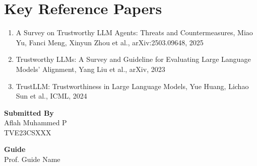 \documentclass[12pt]{article}
\newcommand{\studentname}{Aflah Muhammed P}
\newcommand{\rollno}{TVE23CSXXX}
\newcommand{\guidename}{Prof. Guide Name}
\begin{document}
\section*{Key Reference Papers}
\begin{enumerate}
  \item A Survey on Trustworthy LLM Agents: Threats and Countermeasures, Miao Yu, Fanci Meng, Xinyun Zhou et al., arXiv:2503.09648, 2025
  \item Trustworthy LLMs: A Survey and Guideline for Evaluating Large Language Models' Alignment, Yang Liu et al., arXiv, 2023
  \item TrustLLM: Trustworthiness in Large Language Models, Yue Huang, Lichao Sun et al., ICML, 2024
\end{enumerate}
\vspace{1.5em}

\noindent\textbf{Submitted By}\\
\studentname\\
\rollno

\vspace{1em}
\noindent\textbf{Guide}\\
\guidename
\end{document}
